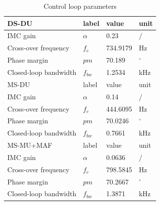 \documentclass[journal]{IEEEtran}
\begin{document}
\begin{table}[h!]
			  \caption{Control loop parameters}
              \label{tab:an_param}
              \centering
              \begin{tabular}{llll}
                           \midrule\midrule
        DS-DU & label & value   & unit\\
        \midrule               
                  IMC gain	& $\alpha$ & 0.23 & /\\  
                  Cross-over frequency  & $f_{c}$ & 734.9179 & Hz   \\
                  Phase margin  & $pm$ & 70.189 &  $^\circ$  \\
                  Closed-loop bandwidth  & $f_{bw}$ & 1.2534 & kHz   \\
                  \midrule\midrule

        MS-DU & label & value   & unit\\
        \midrule               
                  IMC gain	& $\alpha$ & 0.14 & /\\  
                  Cross-over frequency  & $f_{c}$ & 444.6095 & Hz   \\
                  Phase margin  & $pm$ & 70.0246 &  $^\circ$  \\
                  Closed-loop bandwidth  & $f_{bw}$ & 0.7661 & kHz   \\
                  \midrule\midrule
      MS-MU+MAF & label & value   & unit\\
        \midrule               
                  IMC gain	& $\alpha$ & 0.0636 & /\\  
                  Cross-over frequency  & $f_{c}$ & 798.5845 & Hz   \\
                  Phase margin  & $pm$ & 70.2667 &  $^\circ$  \\
                  Closed-loop bandwidth  & $f_{bw}$ & 1.3871 & kHz   \\
                  \midrule\midrule
                                                        
              \end{tabular}
\end{table}
\end{document}
